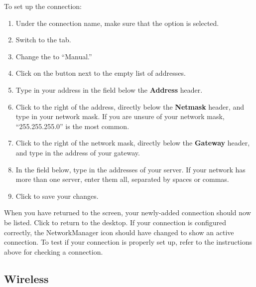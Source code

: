 To set up the connection:

\begin{enumerate}
  \item Under the connection name, make sure that the  option is selected.
  \item Switch to the  tab.
  \item Change the  to ``Manual.''
  \item Click on the  button next to the empty list of addresses.
  \item Type in your  address in the field below the \textbf{Address} 
header.
  \item Click to the right of the  address, directly below the 
\textbf{Netmask} header, and type in your network mask. If you are
unsure of your network mask, ``255.255.255.0'' is the most common.
  \item Click to the right of the network mask, directly below the 
\textbf{Gateway} header, and type in the address of your gateway.
  \item In the  field below, type in the addresses
    of your  server. If your network has more than one  server, enter them all, separated by spaces or commas.
  \item Click  to save your changes.
\end{enumerate}


When you have returned to the  screen, your 
newly-added connection should now be listed. Click  to return to the desktop. If your connection is configured correctly, the NetworkManager icon should have changed to show an active
connection. To test if your connection is properly set up, refer to the instructions above for checking a  connection.

\subsection{Wireless}

